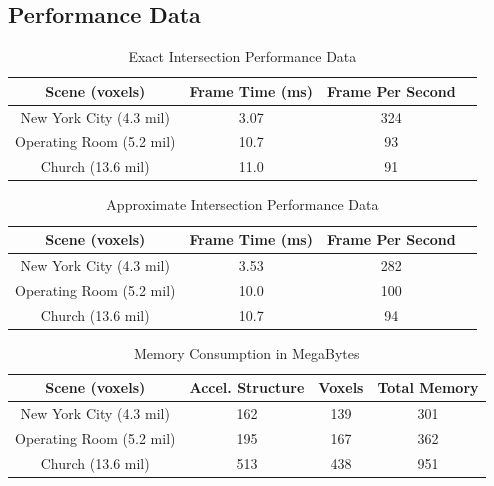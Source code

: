 \documentclass[12pt]{article}
\begin{document}
\subsection{Performance Data}

\begin{table}[H]
    \centering
    \caption{Exact Intersection Performance Data}
    \vspace{0.5cm}
    \label{tab:Exact-Performance-Data}
    \begin{tabular}{c||c|c|c|}
     Scene (voxels)             & Frame Time (ms)    & Frame Per Second \\ \toprule
    New York City (4.3 mil)     & 3.07               & 324              \\
    Operating Room (5.2 mil)    & 10.7               & 93               \\
    Church (13.6 mil)           & 11.0               & 91               \\
    \end{tabular}
\end{table}

\begin{table}[H]
    \centering
    \caption{Approximate Intersection Performance Data}
    \vspace{0.5cm}
    \label{tab:Approx-Performance-Data}
    \begin{tabular}{c||c|c|c|}
     Scene (voxels)             & Frame Time (ms)    & Frame Per Second \\ \toprule
    New York City (4.3 mil)     & 3.53               & 282              \\
    Operating Room (5.2 mil)    & 10.0               & 100              \\
    Church (13.6 mil)           & 10.7               & 94               \\
    \end{tabular}
\end{table}


\begin{table}[H]
    \centering
    \caption{Memory Consumption in MegaBytes}
    \vspace{0.5cm}
    \label{tab:Memory-Consumption}
    \begin{tabular}{c||c|c|c|}
    Scene (voxels)              & Accel. Structure  & Voxels        & Total Memory \\ \toprule
    New York City (4.3 mil)     & 162               & 139           & 301          \\
    Operating Room (5.2 mil)    & 195               & 167           & 362          \\
    Church (13.6 mil)           & 513               & 438           & 951          \\
    \end{tabular}
\end{table}
\end{document}
